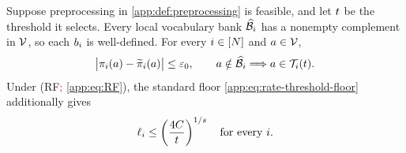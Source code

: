 \begin{lemma}
\label{app:lem:preprocessing-certificates}
Suppose preprocessing in \cref{app:def:preprocessing} is feasible, and let
$t$ be the threshold it selects.  Every local vocabulary bank
$\widehat{\mathcal B}_{i}$ has a nonempty complement in $\mathcal V$, so each
$b_{i}$ is well-defined.  For every
$i\in[N]$ and $a\in\mathcal V$,
\begin{equation}
 \bigl|\pi_{i}(a)-\widetilde\pi_{i}(a)\bigr|
 \le\varepsilon_0,
 \qquad
 a\notin\widehat{\mathcal B}_{i}
 \Longrightarrow a\in\mathcal T_{i}(t).
 \label{app:eq:proof-preprocessing-certificates}
\end{equation}
Under (RF\textcolor{red}{; \cref{app:eq:RF}}), the standard floor \eqref{app:eq:rate-threshold-floor}
additionally gives
\begin{equation}
 \ell_{i}
 \le\left(\frac{4C}{t}\right)^{1/s}
 \quad\text{for every }i.
 \label{app:eq:finite-bank-size-proof}
\end{equation}
\end{lemma}

